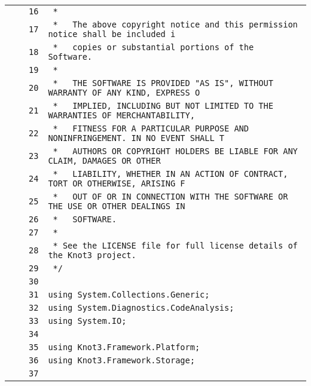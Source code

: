 \documentclass[a4paper,10pt]{article}
\begin{document}
\begin{longtable}[l]{lrrl}
\cellcolor{gray} &  & \verb~16~ & \verb~ *~\\
\cellcolor{gray} &  & \verb~17~ & \verb~ *   The above copyright notice and this permission notice shall be included i~\\
\cellcolor{gray} &  & \verb~18~ & \verb~ *   copies or substantial portions of the Software.~\\
\cellcolor{gray} &  & \verb~19~ & \verb~ *~\\
\cellcolor{gray} &  & \verb~20~ & \verb~ *   THE SOFTWARE IS PROVIDED "AS IS", WITHOUT WARRANTY OF ANY KIND, EXPRESS O~\\
\cellcolor{gray} &  & \verb~21~ & \verb~ *   IMPLIED, INCLUDING BUT NOT LIMITED TO THE WARRANTIES OF MERCHANTABILITY,~\\
\cellcolor{gray} &  & \verb~22~ & \verb~ *   FITNESS FOR A PARTICULAR PURPOSE AND NONINFRINGEMENT. IN NO EVENT SHALL T~\\
\cellcolor{gray} &  & \verb~23~ & \verb~ *   AUTHORS OR COPYRIGHT HOLDERS BE LIABLE FOR ANY CLAIM, DAMAGES OR OTHER~\\
\cellcolor{gray} &  & \verb~24~ & \verb~ *   LIABILITY, WHETHER IN AN ACTION OF CONTRACT, TORT OR OTHERWISE, ARISING F~\\
\cellcolor{gray} &  & \verb~25~ & \verb~ *   OUT OF OR IN CONNECTION WITH THE SOFTWARE OR THE USE OR OTHER DEALINGS IN~\\
\cellcolor{gray} &  & \verb~26~ & \verb~ *   SOFTWARE.~\\
\cellcolor{gray} &  & \verb~27~ & \verb~ *~\\
\cellcolor{gray} &  & \verb~28~ & \verb~ * See the LICENSE file for full license details of the Knot3 project.~\\
\cellcolor{gray} &  & \verb~29~ & \verb~ */~\\
\cellcolor{gray} &  & \verb~30~ & \verb~~\\
\cellcolor{gray} &  & \verb~31~ & \verb~using System.Collections.Generic;~\\
\cellcolor{gray} &  & \verb~32~ & \verb~using System.Diagnostics.CodeAnalysis;~\\
\cellcolor{gray} &  & \verb~33~ & \verb~using System.IO;~\\
\cellcolor{gray} &  & \verb~34~ & \verb~~\\
\cellcolor{gray} &  & \verb~35~ & \verb~using Knot3.Framework.Platform;~\\
\cellcolor{gray} &  & \verb~36~ & \verb~using Knot3.Framework.Storage;~\\
\cellcolor{gray} &  & \verb~37~ & \verb~~\\

\end{longtable}
\end{document}
